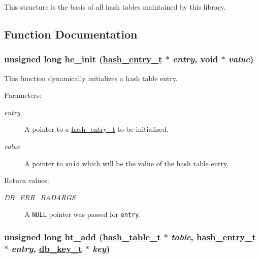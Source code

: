 This structure is the basis of all hash tables maintained by this library. 

\subsection{Function Documentation}
\hypertarget{group__dbprim__hash_a15}{
\subsubsection[he\_\-init]{\setlength{\rightskip}{0pt plus 5cm}unsigned long he\_\-init (\hyperlink{group__dbprim__hash_a1}{hash\_\-entry\_\-t} $\ast$ {\em entry}, void $\ast$ {\em value})}}
\label{group__dbprim__hash_a15}


This function dynamically initializes a hash table entry.\begin{Desc}
\item[Parameters: ]\par
\begin{description}
\item[{\em 
entry}]A pointer to a \hyperlink{group__dbprim__hash_a1}{hash\_\-entry\_\-t} to be initialized. \item[{\em 
value}]A pointer to {\tt void} which will be the value of the hash table entry.\end{description}
\end{Desc}
\begin{Desc}
\item[Return values: ]\par
\begin{description}
\item[{\em 
DB\_\-ERR\_\-BADARGS}]A {\tt NULL} pointer was passed for {\tt entry}. \end{description}
\end{Desc}
\hypertarget{group__dbprim__hash_a7}{
\subsubsection[ht\_\-add]{\setlength{\rightskip}{0pt plus 5cm}unsigned long ht\_\-add (\hyperlink{group__dbprim__hash_a0}{hash\_\-table\_\-t} $\ast$ {\em table}, \hyperlink{group__dbprim__hash_a1}{hash\_\-entry\_\-t} $\ast$ {\em entry}, \hyperlink{group__dbprim_a0}{db\_\-key\_\-t} $\ast$ {\em key})}}
\label{group__dbprim__hash_a7}


